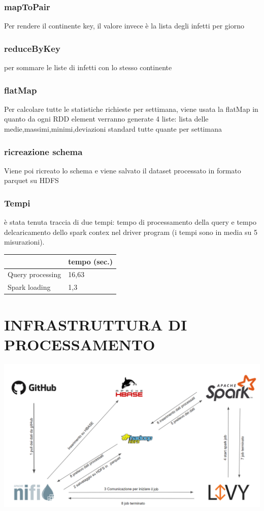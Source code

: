 \documentclass[acmsmall]{acmart}
\begin{document}
\subsubsection{mapToPair}
Per rendere il continente key, il valore invece è la lista degli infetti per giorno 
\subsubsection{reduceByKey}
per sommare le liste di infetti con lo stesso continente

\subsubsection{flatMap}
Per calcolare tutte le statistiche richieste per settimana, viene usata la flatMap in quanto da ogni RDD element verranno generate 4 liste:
lista delle medie,massimi,minimi,deviazioni standard tutte quante per settimana 
\subsubsection{ricreazione schema}
Viene poi ricreato lo schema e viene salvato il dataset processato in formato parquet su HDFS

\subsubsection{Tempi}
è stata tenuta traccia di due tempi: tempo di processamento della query e tempo delcaricamento dello spark contex nel driver program (i tempi sono in media su 5 misurazioni).

\hspace{40mm} \begin{tabular}{l|l|}
\cline{2-2}
                                       & tempo (sec.) \\ \hline
\multicolumn{1}{|l|}{Query processing} & 16,63            \\ \hline
\multicolumn{1}{|l|}{Spark loading}    & 1,3            \\ \hline
\end{tabular}


\section{INFRASTRUTTURA DI PROCESSAMENTO}


\includegraphics[width=14cm]{sistema.png}
\end{document}

